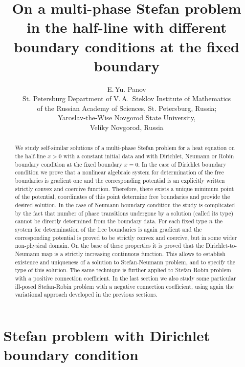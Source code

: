 \documentclass[12pt]{article}
\date{}
\title{On a multi-phase Stefan problem in the half-line with different boundary conditions at the fixed boundary}
\author{E.\,Yu. Panov \\
St. Petersburg Department of V.\,A.~Steklov Institute of Mathematics \\ of the Russian Academy of Sciences,
St. Petersburg, Russia; \\
Yaroslav-the-Wise Novgorod State University, \\ Veliky Novgorod, Russia}%
\theoremstyle{plain}
\theoremstyle{definition}
\numberwithin{equation}{section}
\begin{document}
\maketitle

\begin{abstract}
We study self-similar solutions of a multi-phase Stefan problem for a heat equation on the half-line $x>0$ with a constant initial data and with Dirichlet, Neumann or Robin boundary condition at the fixed boundary $x=0$. In the case of Dirichlet boundary condition we prove that a nonlinear algebraic system for determination of the free boundaries is gradient one and the corresponding potential is an explicitly written strictly convex and coercive function. Therefore, there exists a unique minimum point of the potential, coordinates of this point determine free boundaries and provide the desired solution. In the case of Neumann boundary condition the study is complicated by the fact that number of phase transitions undergone by a solution (called its type) cannot be directly determined from the boundary data. For each fixed type $n$ the system for determination of the free boundaries is again gradient and the corresponding potential is proved to be strictly convex and coercive, but in some wider non-physical domain. On the base of these properties it is proved that the Dirichlet-to-Neumann map is a strictly increasing continuous function. This allows to establish existence and uniqueness of a solution to Stefan-Neumann problem, and to specify the type of this solution. The same technique is further applied to Stefan-Robin problem with a positive connection coefficient. In the last section we also study some particular ill-posed Stefan-Robin problem with a negative connection coefficient, using again the variational approach developed in the previous sections.
\end{abstract}



\section{Stefan problem with Dirichlet boundary condition}\label{sec1}
\end{document}
